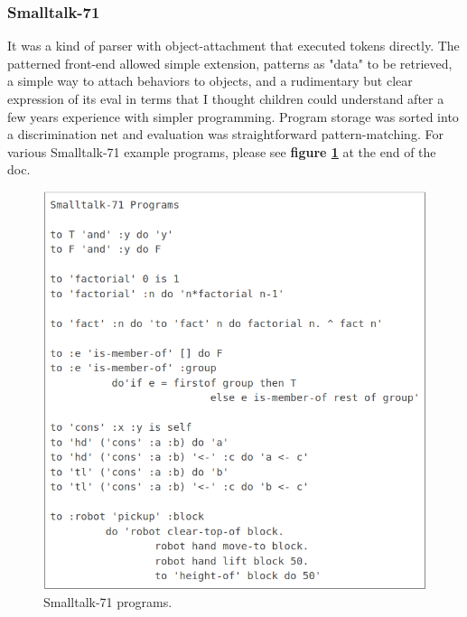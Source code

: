 \documentclass[letterpaper,12pt,parskip=full]{article}
\begin{document}
\subsubsection{Smalltalk-71}

 It was a kind of parser with object-attachment that executed tokens directly. The patterned front-end allowed simple extension, patterns as "data" to be retrieved, a simple way to attach behaviors to objects, and a rudimentary but clear expression of its eval in terms that I thought children could understand after a few years experience with simpler programming. Program storage was sorted into a discrimination net and evaluation was straightforward pattern-matching. For various Smalltalk-71 example programs, please see \textbf{figure \ref{fig:smalltalk_71}} at the end of the doc.
 
 \begin{figure}[ht]
        \centering \includegraphics[scale=0.75]{SMALLTALK_71.png}
        \caption{
                \label{fig:smalltalk_71} %
                Smalltalk-71 programs.
        }
\end{figure}
\end{document}
